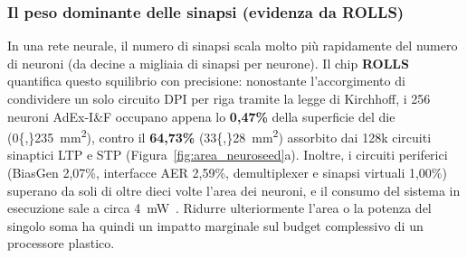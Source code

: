 \subsubsection{Il peso dominante delle sinapsi (evidenza da ROLLS)}
In una rete neurale, il numero di sinapsi scala molto più rapidamente del numero di neuroni (da decine a migliaia di sinapsi per neurone). Il chip \textbf{ROLLS}~\cite{qiao2015} quantifica questo squilibrio con precisione: nonostante l'accorgimento di condividere un solo circuito DPI per riga tramite la legge di Kirchhoff, i 256 neuroni AdEx-I\&F occupano appena lo \textbf{0,47\%} della superficie del die (\SI{0{,}235}{\milli\meter\squared}), contro il \textbf{64,73\%} (\SI{33{,}28}{\milli\meter\squared}) assorbito dai 128k circuiti sinaptici LTP e STP (Figura~\ref{fig:area_neuroseed}a). Inoltre, i circuiti periferici (BiasGen 2,07\%, interfacce AER 2,59\%, demultiplexer e sinapsi virtuali 1,00\%) superano da soli di oltre dieci volte l'area dei neuroni, e il consumo del sistema in esecuzione sale a circa \SI{4}{\milli\watt}~\cite{qiao2015}. Ridurre ulteriormente l'area o la potenza del singolo soma ha quindi un impatto marginale sul budget complessivo di un processore plastico.

